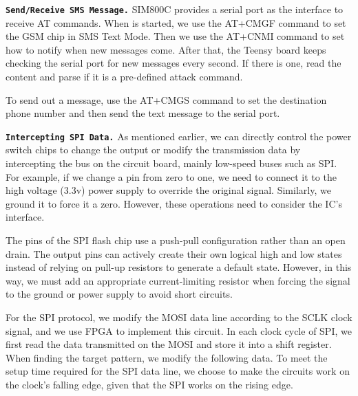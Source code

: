 \textbf{\texttt{Send/Receive SMS Message.}} SIM800C provides a serial port as the interface to receive AT commands. When \name is started, we use the AT+CMGF command to set the GSM chip in SMS Text Mode. Then we use the AT+CNMI command to set how to notify when new messages come. After that, the Teensy board keeps checking the serial port for new messages every second. If there is one, read the content and parse if it is a pre-defined attack command.

To send out a message, use the AT+CMGS command to set the destination phone number and then send the text message to the serial port. 


\textbf{\texttt{Intercepting SPI Data.}} As mentioned earlier, we can directly control the power switch chips to change the output or modify the transmission data by intercepting the bus on the circuit board, mainly low-speed buses such as SPI. For example, if we change a pin from zero to one, we need to connect it to the high voltage (3.3v) power supply to override the original signal. Similarly, we ground it to force it a zero. 
However, these operations need to consider the IC's interface.

The pins of the SPI flash chip use a push-pull configuration rather than an open drain. The output pins can actively create their own logical high and low states instead of relying on pull-up resistors to generate a default state. However, in this way, we must add an appropriate current-limiting resistor when forcing the signal to the ground or power supply to avoid short circuits.

For the SPI protocol, we modify the MOSI data line according to the SCLK clock signal, and we use FPGA to implement this circuit. In each clock cycle of SPI, we first read the data transmitted on the MOSI and store it into a shift register. When finding the target pattern, we modify the following data. To meet the setup time required for the SPI data line, we choose to make the circuits work on the clock's falling edge, given that the SPI works on the rising edge.
